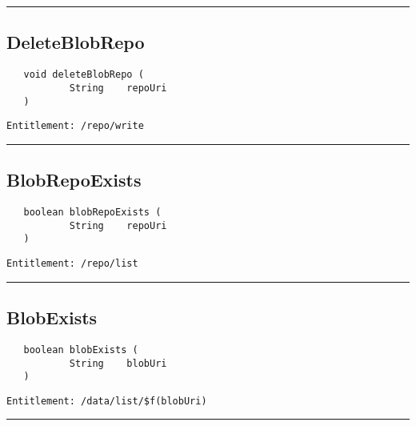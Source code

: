 \rule{12cm}{2pt}
\subsection{DeleteBlobRepo}
\label{Api:DeleteBlobRepo}
\begin{verbatim}
   void deleteBlobRepo (
           String    repoUri
   )
\end{verbatim}
\begin{Verbatim}[fontsize=\small, formatcom=\color{Maroon}]
  Entitlement: /repo/write
\end{Verbatim}



\rule{12cm}{2pt}
\subsection{BlobRepoExists}
\label{Api:BlobRepoExists}
\begin{verbatim}
   boolean blobRepoExists (
           String    repoUri
   )
\end{verbatim}
\begin{Verbatim}[fontsize=\small, formatcom=\color{Maroon}]
  Entitlement: /repo/list
\end{Verbatim}



\rule{12cm}{2pt}
\subsection{BlobExists}
\label{Api:BlobExists}
\begin{verbatim}
   boolean blobExists (
           String    blobUri
   )
\end{verbatim}
\begin{Verbatim}[fontsize=\small, formatcom=\color{Maroon}]
  Entitlement: /data/list/$f(blobUri)
\end{Verbatim}



\rule{12cm}{2pt}
